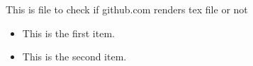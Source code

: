 \documentclass{article}
\begin{document}
This is file to check if github.com renders tex file or not

\begin{itemize}

\item This is the first item.
\item This is the second item.

\end{itemize}
\end{document}
